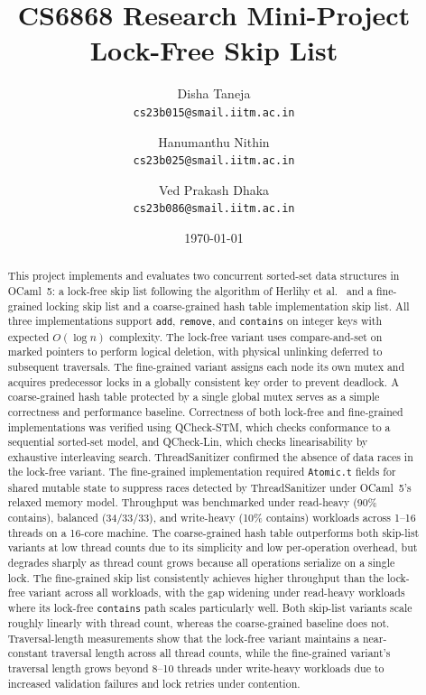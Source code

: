 \documentclass[11pt,a4paper]{article}
\title{%
  \textbf{CS6868 Research Mini-Project} \\[0.3em]
  \Large Lock-Free Skip List%
}
\author{%
  Disha Taneja \\ \texttt{cs23b015@smail.iitm.ac.in}
  \and
  Hanumanthu Nithin \\ \texttt{cs23b025@smail.iitm.ac.in}
  \and
  Ved Prakash Dhaka\\ \texttt{cs23b086@smail.iitm.ac.in}
}
\date{\today}
\begin{document}
\maketitle

\begin{abstract}
This project implements and evaluates two concurrent sorted-set data structures
in OCaml~5: a lock-free skip list following the algorithm of Herlihy et
al.~\cite{herlihy2021art} and a fine-grained locking skip list and a coarse-grained hash table implementation skip list.
All three implementations support \texttt{add}, \texttt{remove}, and \texttt{contains} on integer
keys with expected $O(\log n)$ complexity. The lock-free variant uses
compare-and-set on marked pointers to perform logical deletion, with physical
unlinking deferred to subsequent traversals. The fine-grained variant assigns
each node its own mutex and acquires predecessor locks in a globally consistent
key order to prevent deadlock. A coarse-grained hash table protected by a
single global mutex serves as a simple correctness and performance baseline.
Correctness of both lock-free and fine-grained implementations was verified using QCheck-STM, which checks
conformance to a sequential sorted-set model, and QCheck-Lin, which checks
linearisability by exhaustive interleaving search. ThreadSanitizer confirmed the
absence of data races in the lock-free variant. The fine-grained implementation
required \texttt{Atomic.t} fields for shared mutable state to suppress races
detected by ThreadSanitizer under OCaml~5's relaxed memory model. Throughput
was benchmarked under read-heavy (90\% contains), balanced (34/33/33), and
write-heavy (10\% contains) workloads across 1--16 threads on a 16-core
machine. The coarse-grained hash table outperforms both skip-list variants at
low thread counts due to its simplicity and low per-operation overhead, but
degrades sharply as thread count grows because all operations serialize on a
single lock. The fine-grained skip list consistently achieves higher throughput
than the lock-free variant across all workloads, with the gap widening under
read-heavy workloads where its lock-free \texttt{contains} path scales
particularly well. Both skip-list variants scale roughly linearly with thread
count, whereas the coarse-grained baseline does not. Traversal-length
measurements show that the lock-free variant maintains a near-constant traversal
length across all thread counts, while the fine-grained variant's traversal
length grows beyond 8--10 threads under write-heavy workloads due to increased
validation failures and lock retries under contention.
\end{abstract}
\end{document}
